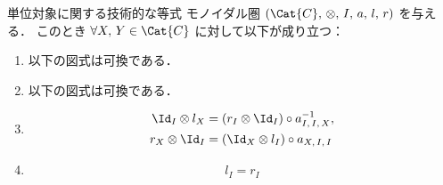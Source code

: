 \documentclass[TQFT_main]{subfiles}
\begin{document}
\begin{myprop}[label=prop:monidal-unit]{単位対象に関する技術的な等式}
    モノイダル圏 $(\Cat{C},\, \otimes,\, I,\, a,\, l,\, r)$ を与える．
    このとき $\forall X,\, Y \in \Cat{C}$ に対して以下が成り立つ：
    \begin{enumerate}
        \item 以下の図式は可換である．
        \begin{center}
        \end{center}
        
        \item 以下の図式は可換である．
        \begin{center}
        \end{center}
        
       \item 
       \begin{align}
           \Id_I \otimes l_X &= (r_I \otimes \Id_I) \circ a_{I,\, I,\, X}^{-1}, \\
           r_X \otimes \Id_I &= (\Id_X \otimes l_I) \circ a_{X,\, I,\, I}
       \end{align}
       \item
       \begin{align}
           l_I = r_I
       \end{align}
    \end{enumerate}
\end{myprop}
\end{document}
